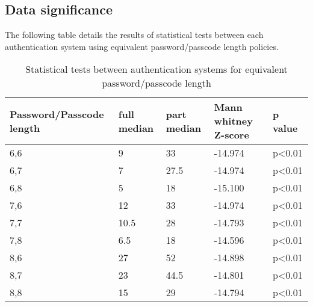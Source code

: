 \documentclass[british,11pt,a4paper]{article}
\begin{document}
\begin{appendices}
  	\subsection{Data significance}
  	\label{app:significant_stats}
  	The following table details the results of statistical tests between each authentication system using equivalent password/passcode length policies.
  	\begin{table}[h]
	\centering
	\begin{tabular}{|l|l|l|l|l|}
	\hline
	\textbf{Password/Passcode length} & \textbf{full median} & \textbf{part median} & \textbf{Mann whitney Z-score} & \textbf{p value} \\ \hline
	6,6 & 9 & 33 & -14.974 & p\textless0.01 \\ \hline
	6,7 & 7 & 27.5 & -14.974 & p\textless0.01 \\ \hline
	6,8 & 5 & 18 & -15.100 & p\textless0.01 \\ \hline
	7,6 & 12 & 33 & -14.974 & p\textless0.01 \\ \hline
	7,7 & 10.5 & 28 & -14.793 & p\textless0.01 \\ \hline
	7,8 & 6.5 & 18 & -14.596 & p\textless0.01 \\ \hline
	8,6 & 27 & 52 & -14.898 & p\textless0.01 \\ \hline
	8,7 & 23 & 44.5 & -14.801 & p\textless0.01 \\ \hline
	8,8 & 15 & 29 & -14.794 & p\textless0.01 \\ \hline
	\end{tabular}
	\caption{Statistical tests between authentication systems for equivalent password/passcode length}
	\label{tab:significance}
	\end{table}


\end{appendices}
\end{document}
